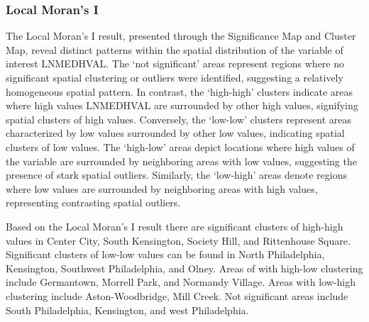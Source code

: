 \documentclass[
]{article}
\begin{document}
\hypertarget{local-morans-i}{%
\subsubsection{Local Moran's I}\label{local-morans-i}}

The Local Moran's I result, presented through the Significance Map and
Cluster Map, reveal distinct patterns within the spatial distribution of
the variable of interest LNMEDHVAL. The `not significant' areas
represent regions where no significant spatial clustering or outliers
were identified, suggesting a relatively homogeneous spatial pattern. In
contrast, the `high-high' clusters indicate areas where high values
LNMEDHVAL are surrounded by other high values, signifying spatial
clusters of high values. Conversely, the `low-low' clusters represent
areas characterized by low values surrounded by other low values,
indicating spatial clusters of low values. The `high-low' areas depict
locations where high values of the variable are surrounded by
neighboring areas with low values, suggesting the presence of stark
spatial outliers. Similarly, the `low-high' areas denote regions where
low values are surrounded by neighboring areas with high values,
representing contrasting spatial outliers.

Based on the Local Moran's I result there are significant clusters of
high-high values in Center City, South Kensington, Society Hill, and
Rittenhouse Square. Significant clusters of low-low values can be found
in North Philadelphia, Kensington, Southwest Philadelphia, and Olney.
Areas of with high-low clustering include Germantown, Morrell Park, and
Normandy Village. Areas with low-high clustering include
Aston-Woodbridge, Mill Creek. Not significant areas include South
Philadelphia, Kensington, and west Philadelphia.
\end{document}
